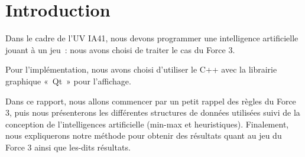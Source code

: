 \chapter{Introduction}

Dans le cadre de l'UV IA41, nous devons programmer une intelligence
artificielle jouant à un jeu : nous avons choisi de traiter le cas du Force 3.

Pour l'implémentation, nous avons choisi d'utiliser le C++ avec la
librairie graphique « Qt » pour l'affichage.

Dans ce rapport, nous allons commencer par un petit rappel des règles du Force 3, puis
nous présenterons les différentes structures de données utilisées suivi de la conception de
l'intelligences artificielle (min-max et heuristiques). Finalement, nous
expliquerons notre méthode pour obtenir des résultats quant au jeu du Force 3 ainsi que les-dits résultats.

